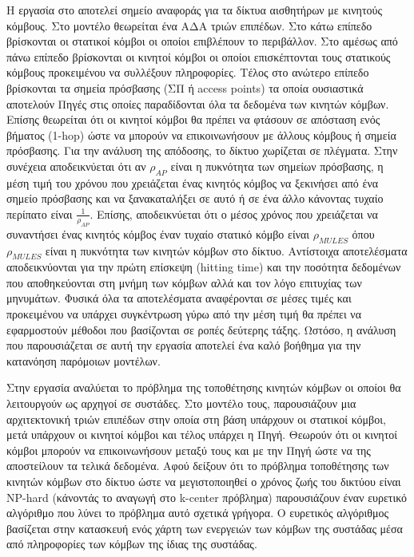 Η εργασία στο \cite{data_mules} αποτελεί σημείο αναφοράς για τα δίκτυα αισθητήρων με κινητούς κόμβους. Στο μοντέλο θεωρείται ένα ΑΔΑ τριών επιπέδων. Στο κάτω επίπεδο
βρίσκονται οι στατικοί κόμβοι οι οποίοι επιβλέπουν το περιβάλλον. Στο αμέσως από πάνω επίπεδο βρίσκονται οι κινητοί κόμβοι οι οποίοι επισκέπτονται τους στατικούς
κόμβους προκειμένου να συλλέξουν πληροφορίες. Τέλος στο ανώτερο επίπεδο βρίσκονται τα σημεία πρόσβασης (ΣΠ ή access points) τα οποία ουσιαστικά αποτελούν Πηγές στις
οποίες παραδίδονται όλα τα δεδομένα των κινητών κόμβων. Επίσης θεωρείται ότι οι κινητοί κόμβοι θα πρέπει να φτάσουν σε απόσταση ενός βήματος (1-hop) ώστε να μπορούν
να επικοινωνήσουν με άλλους κόμβους ή σημεία πρόσβασης. Για την ανάλυση της απόδοσης, το δίκτυο χωρίζεται σε πλέγματα. Στην συνέχεια αποδεικνύεται ότι αν $\rho_{AP}$
είναι η πυκνότητα των σημείων πρόσβασης, η μέση τιμή του χρόνου που χρειάζεται ένας κινητός κόμβος να ξεκινήσει από ένα σημείο πρόσβασης και να ξανακαταλήξει σε αυτό
ή σε ένα άλλο κάνοντας τυχαίο περίπατο είναι $\frac{1}{\rho_{AP}}$. Επίσης, αποδεικνύεται ότι ο μέσος χρόνος που χρειάζεται να συναντήσει ένας κινητός κόμβος έναν
τυχαίο στατικό κόμβο είναι $\rho_{MULES}$ όπου $\rho_{MULES}$ είναι η πυκνότητα των κινητών κόμβων στο δίκτυο. Αντίστοιχα αποτελέσματα αποδεικνύονται για την πρώτη
επίσκεψη (hitting time) και την ποσότητα δεδομένων που αποθηκεύονται στη μνήμη των κόμβων αλλά και τον λόγο επιτυχίας των μηνυμάτων. Φυσικά όλα τα αποτελέσματα
αναφέρονται σε μέσες τιμές και προκειμένου να υπάρχει συγκέντρωση γύρω από την μέση τιμή θα πρέπει να εφαρμοστούν μέθοδοι που βασίζονται σε ροπές δεύτερης τάξης.
Ωστόσο, η ανάλυση που παρουσιάζεται σε αυτή την εργασία αποτελεί ένα καλό βοήθημα για την κατανόηση παρόμοιων μοντέλων.

Στην εργασία \cite{yuanyuan1} αναλύεται το πρόβλημα της τοποθέτησης κινητών κόμβων οι οποίοι θα λειτουργούν ως αρχηγοί σε συστάδες. Στο μοντέλο τους, παρουσιάζουν
μια αρχιτεκτονική τριών επιπέδων στην οποία στη βάση υπάρχουν οι στατικοί κόμβοι, μετά υπάρχουν οι κινητοί κόμβοι και τέλος υπάρχει η Πηγή. Θεωρούν ότι οι
κινητοί κόμβοι μπορούν να επικοινωνήσουν μεταξύ τους και με την Πηγή ώστε να της αποστείλουν τα τελικά δεδομένα. Αφού δείξουν ότι το πρόβλημα τοποθέτησης των κινητών
κόμβων στο δίκτυο ώστε να μεγιστοποιηθεί ο χρόνος ζωής του δικτύου είναι NP-hard (κάνοντάς το αναγωγή στο k-center πρόβλημα) παρουσιάζουν έναν ευρετικό αλγόριθμο που
λύνει το πρόβλημα αυτό σχετικά γρήγορα. Ο ευρετικός αλγόριθμος βασίζεται στην κατασκευή ενός χάρτη των ενεργειών των κόμβων της συστάδας μέσα από πληροφορίες των
κόμβων της ίδιας της συστάδας.


